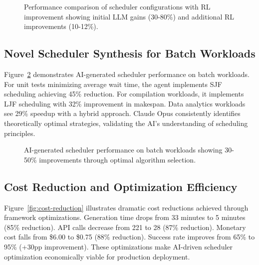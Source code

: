 \begin{figure}[h]
\centering
{}
\caption{Performance comparison of scheduler configurations with RL improvement showing initial LLM gains (30-80\%) and additional RL improvements (10-12\%).}
\label{fig:performance-comparison}
\end{figure}

\subsection{Novel Scheduler Synthesis for Batch Workloads}

Figure~\ref{fig:batch-performance} demonstrates AI-generated scheduler performance on batch workloads. For unit tests minimizing average wait time, the agent implements SJF scheduling achieving 45\% reduction. For compilation workloads, it implements LJF scheduling with 32\% improvement in makespan. Data analytics workloads see 29\% speedup with a hybrid approach. Claude Opus consistently identifies theoretically optimal strategies, validating the AI's understanding of scheduling principles.

\begin{figure}[h]
\centering
{}
\caption{AI-generated scheduler performance on batch workloads showing 30-50\% improvements through optimal algorithm selection.}
\label{fig:batch-performance}
\end{figure}

\subsection{Cost Reduction and Optimization Efficiency}

Figure~\ref{fig:cost-reduction} illustrates dramatic cost reductions achieved through framework optimizations. Generation time drops from 33 minutes to 5 minutes (85\% reduction). API calls decrease from 221 to 28 (87\% reduction). Monetary cost falls from \$6.00 to \$0.75 (88\% reduction). Success rate improves from 65\% to 95\% (+30pp improvement). These optimizations make AI-driven scheduler optimization economically viable for production deployment.

